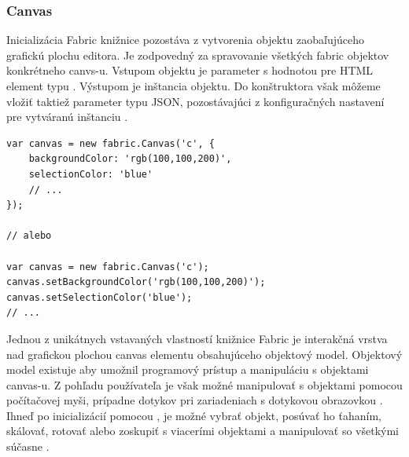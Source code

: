 \subsubsection{Canvas}
Inicializácia Fabric knižnice pozostáva z vytvorenia  objektu zaobaľujúceho grafickú plochu editora. Je zodpovedný za spravovanie všetkých fabric objektov konkrétneho canvs-u. Vstupom objektu je parameter s hodnotou  pre HTML element typu . Výstupom je inštancia  objektu. Do konštruktora však môžeme vložiť taktiež parameter typu JSON, pozostávajúci z konfiguračných nastavení pre vytváranú inštanciu . 
\begin{lstlisting}[style=web,caption={Inicializácia Fabric canvas wrappera},captionpos=b, label={lst:fabric.init}]
var canvas = new fabric.Canvas('c', {
	backgroundColor: 'rgb(100,100,200)',
	selectionColor: 'blue'
	// ...
});

// alebo

var canvas = new fabric.Canvas('c');
canvas.setBackgroundColor('rgb(100,100,200)');
canvas.setSelectionColor('blue');
// ...
\end{lstlisting}
Jednou z unikátnych vstavaných vlastností knižnice Fabric je interakčná vrstva nad grafickou plochou canvas elementu obsahujúceho objektový model. Objektový model existuje aby umožnil programový prístup a manipuláciu s objektami canvas-u. Z pohľadu používateľa je však možné manipulovať s objektami pomocou počítačovej myši, prípadne dotykov pri zariadeniach s dotykovou obrazovkou . Ihneď po inicializácií pomocou , je možné vybrať objekt, posúvať ho ťahaním, skálovať, rotovať alebo zoskupiť s viacerími objektami a manipulovať so všetkými súčasne .  

